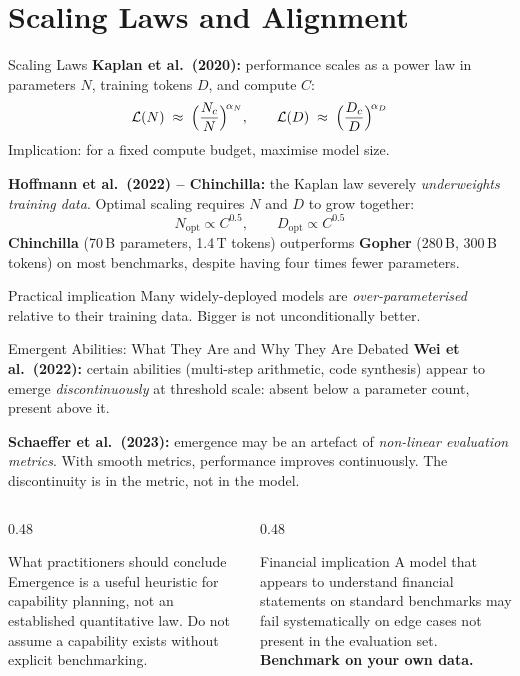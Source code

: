 \documentclass[11pt,aspectratio=169,professionalfonts]{beamer}
\begin{document}
\section{Scaling Laws and Alignment}
%
\begin{frame}{Scaling Laws}
  \textbf{Kaplan et al.\ (2020):} performance scales as a power law
  in parameters $N$, training tokens $D$, and compute $C$:
  \[
    \mathcal{L}(N) \;\approx\; \Bigl(\frac{N_c}{N}\Bigr)^{\!\alpha_N},
    \qquad
    \mathcal{L}(D) \;\approx\; \Bigl(\frac{D_c}{D}\Bigr)^{\!\alpha_D}
  \]
  Implication: for a fixed compute budget, maximise model size.

  \medskip
  \textbf{Hoffmann et al.\ (2022) -- Chinchilla:}
  the Kaplan law severely \emph{underweights training data}.
  Optimal scaling requires $N$ and $D$ to grow together:
  \[
    N_{\mathrm{opt}} \propto C^{0.5},
    \qquad
    D_{\mathrm{opt}} \propto C^{0.5}
  \]
  \textbf{Chinchilla} (70\,B parameters, 1.4\,T tokens) outperforms
  \textbf{Gopher} (280\,B, 300\,B tokens) on most benchmarks,
  despite having four times fewer parameters.

  \begin{block}{Practical implication}
    Many widely-deployed models are \emph{over-parameterised} relative to
    their training data.  Bigger is not unconditionally better.
  \end{block}
\end{frame}
%
%
\begin{frame}{Emergent Abilities: What They Are and Why They Are Debated}
  \textbf{Wei et al.\ (2022):} certain abilities (multi-step arithmetic,
  code synthesis) appear to emerge \emph{discontinuously} at threshold scale:
  absent below a parameter count, present above it.

  \medskip
  \textbf{Schaeffer et al.\ (2023):} emergence may be an artefact of
  \emph{non-linear evaluation metrics}.
  With smooth metrics, performance improves continuously.
  The discontinuity is in the metric, not in the model.

  \begin{columns}[T]
    \begin{column}{0.48\linewidth}
      \begin{block}{What practitioners should conclude}
        Emergence is a useful heuristic for capability planning,
        not an established quantitative law.
        Do not assume a capability exists without explicit benchmarking.
      \end{block}
    \end{column}
    \begin{column}{0.48\linewidth}
      \begin{alertblock}{Financial implication}
        A model that appears to understand financial statements on
        standard benchmarks may fail systematically on edge cases
        not present in the evaluation set.
        \textbf{Benchmark on your own data.}
      \end{alertblock}
    \end{column}
  \end{columns}
\end{frame}
\end{document}

